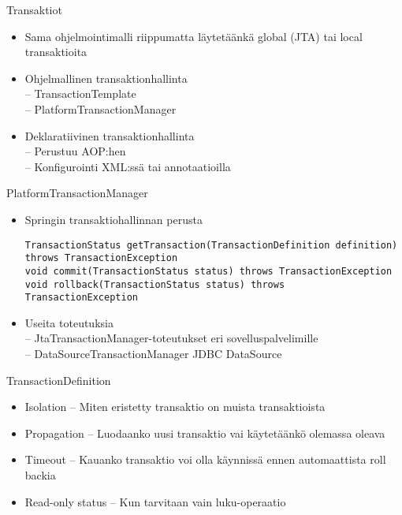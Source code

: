 \documentclass[hyperref={pdfauthor=\AUTHOR},14pt]{beamer}
\author{\AUTHOR}
\title[\TITLE]{\TITLE}
\date{\DATE}
\begin{document}
\begin{frame}[plain]
\titlepage
\end{frame}

\begin{frame}[t, fragile]{Transaktiot}
\begin{itemize}
\item Sama ohjelmointimalli riippumatta läytetäänkä global (JTA) tai local transaktioita
\item Ohjelmallinen transaktionhallinta \\
-- TransactionTemplate \\
-- PlatformTransactionManager
\item Deklaratiivinen transaktionhallinta\\
-- Perustuu AOP:hen\\
-- Konfigurointi XML:ssä tai annotaatioilla
\end{itemize}
\end{frame}

\begin{frame}[t, fragile]{PlatformTransactionManager}
\begin{itemize}
\item Springin transaktiohallinnan perusta 

\lstset{language=Java,style=Java}
\begin{lstlisting}
TransactionStatus getTransaction(TransactionDefinition definition) throws TransactionException
void commit(TransactionStatus status) throws TransactionException
void rollback(TransactionStatus status) throws  TransactionException
\end{lstlisting}
\item Useita toteutuksia\\
-- JtaTransactionManager-toteutukset eri sovelluspalvelimille\\
-- DataSourceTransactionManager JDBC DataSource
\end{itemize}
\end{frame}

\begin{frame}[t, fragile]{TransactionDefinition}
\begin{itemize}
\item Isolation -- Miten eristetty transaktio on muista transaktioista
\item  Propagation -- Luodaanko uusi transaktio vai käytetäänkö olemassa oleava
\item Timeout -- Kauanko transaktio voi olla käynnissä ennen automaattista roll backia
\item Read-only status -- Kun tarvitaan vain luku-operaatio
\end{itemize}
\end{frame}
\end{document}
